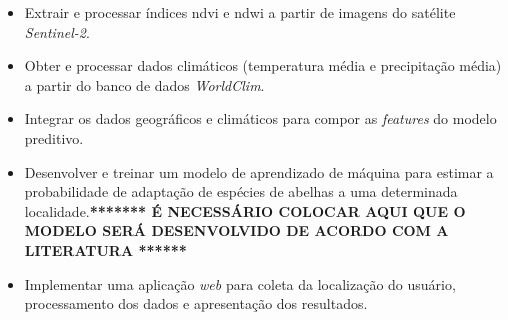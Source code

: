 \begin{itemize}
    \item Extrair e processar índices \gls{ndvi} e \gls{ndwi} a partir de imagens do satélite \textit{Sentinel-2}.
    \item Obter e processar dados climáticos (temperatura média e precipitação média) a partir do banco de dados \textit{WorldClim}.
    \item Integrar os dados geográficos e climáticos para compor as \textit{features} do modelo preditivo.
    \item Desenvolver e treinar um modelo de aprendizado de máquina para estimar a probabilidade de adaptação de espécies de abelhas a uma determinada localidade.\textbf{******* É NECESSÁRIO COLOCAR AQUI QUE O MODELO SERÁ DESENVOLVIDO DE ACORDO COM A LITERATURA ******}
    \item Implementar uma aplicação \textit{web} para coleta da localização do usuário, processamento dos dados e apresentação dos resultados.
\end{itemize}

